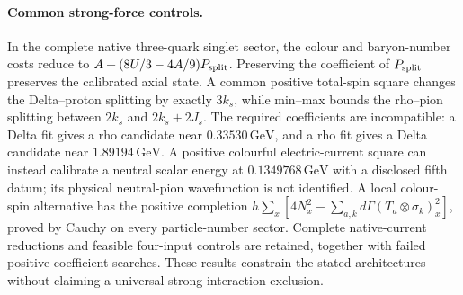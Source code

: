 \paragraph{Common strong-force controls.}
In the complete native three-quark singlet sector, the colour and
baryon-number costs reduce to $A+(8U/3-4A/9)P_{\rm split}$.
Preserving the coefficient of $P_{\rm split}$ preserves the calibrated
axial state. A common positive total-spin square changes the Delta--proton
splitting by exactly $3k_s$, while min--max bounds the rho--pion splitting
between $2k_s$ and $2k_s+2J_s$. The required coefficients are incompatible:
a Delta fit gives a rho candidate near $0.33530\,\mathrm{GeV}$, and a rho
fit gives a Delta candidate near $1.89194\,\mathrm{GeV}$.
A positive colourful electric-current square can instead calibrate a neutral
scalar energy at $0.1349768\,\mathrm{GeV}$ with a disclosed fifth datum;
its physical neutral-pion wavefunction is not identified.
A local colour-spin alternative has the positive completion
$h\sum_x[4N_x^2-\sum_{a,k}d\Gamma(T_a\otimes\sigma_k)_x^2]$,
proved by Cauchy on every particle-number sector. Complete native-current
reductions and feasible four-input controls are retained, together with
failed positive-coefficient searches. These results constrain the stated
architectures without claiming a universal strong-interaction exclusion.
